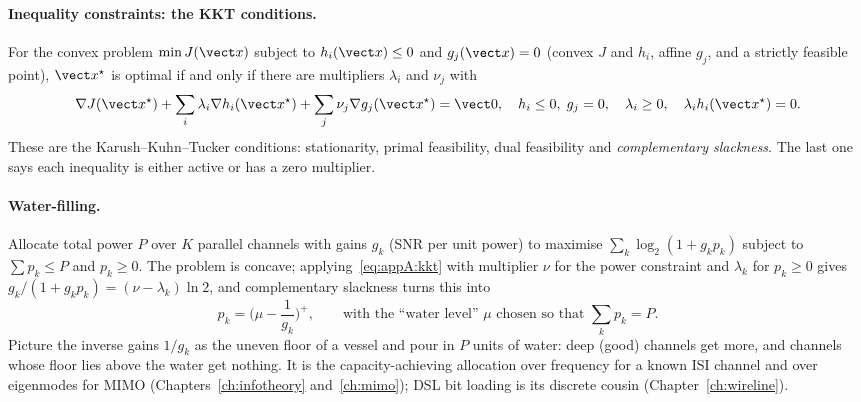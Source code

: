 
\paragraph{Inequality constraints: the KKT conditions.} For the convex problem
$\min J(\vect x)$ subject to $h_i(\vect x)\le0$ and $g_j(\vect x)=0$ (convex $J$ and $h_i$, affine
$g_j$, and a strictly feasible point), $\vect x^\star$ is optimal if and only if there are multipliers
$\lambda_i$ and $\nu_j$ with
\begin{equation}
\nabla J(\vect x^\star)+\sum_i\lambda_i\nabla h_i(\vect x^\star)+\sum_j\nu_j\nabla g_j(\vect x^\star)=\vect0,\quad
h_i\le0,\; g_j=0,\quad \lambda_i\ge0,\quad \lambda_ih_i(\vect x^\star)=0.
\label{eq:appA:kkt}
\end{equation}
These are the Karush--Kuhn--Tucker conditions: stationarity, primal feasibility, dual feasibility and
\emph{complementary slackness}. The last one says each inequality is either active or has a zero
multiplier.

\paragraph{Water-filling.} Allocate total power $P$ over $K$ parallel channels with gains $g_k$
(SNR per unit power) to maximise $\sum_k\log_2(1+g_kp_k)$ subject to $\sum p_k\le P$ and
$p_k\ge0$. The problem is concave; applying~\eqref{eq:appA:kkt} with multiplier $\nu$ for the
power constraint and $\lambda_k$ for $p_k\ge0$ gives $g_k/(1+g_kp_k)=(\nu-\lambda_k)\ln 2$, and
complementary slackness turns this into
\begin{equation}
p_k=\Big(\mu-\frac{1}{g_k}\Big)^+,\qquad\text{with the ``water level'' }\mu\text{ chosen so that }\sum_kp_k=P.
\label{eq:appA:waterfill}
\end{equation}
Picture the inverse gains $1/g_k$ as the uneven floor of a vessel and pour in $P$ units of water:
deep (good) channels get more, and channels whose floor lies above the water get nothing.
It is the capacity-achieving allocation over frequency for a known ISI channel and over
eigenmodes for MIMO (Chapters~\ref{ch:infotheory} and~\ref{ch:mimo}); DSL bit loading is its
discrete cousin (Chapter~\ref{ch:wireline}).

